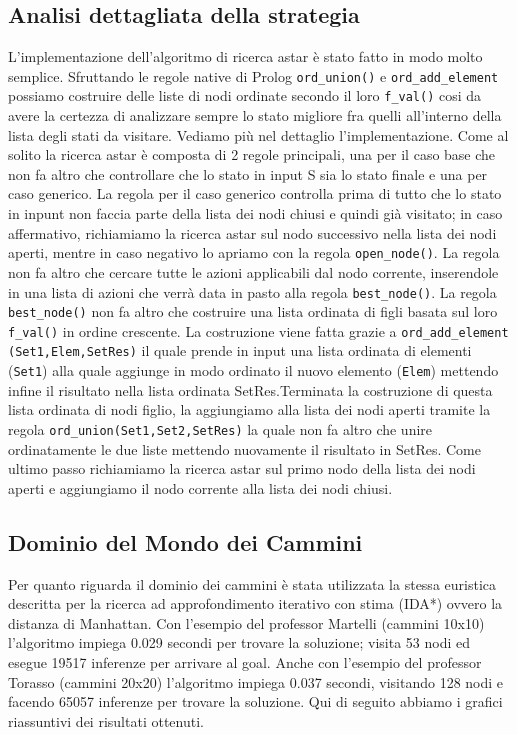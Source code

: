 \subsection{Analisi dettagliata della strategia}

L'implementazione dell'algoritmo di ricerca astar è stato fatto in modo molto semplice. Sfruttando le regole native di Prolog \lstinline{ord_union()} e \lstinline{ord_add_element} possiamo costruire delle liste di nodi ordinate secondo il loro \lstinline{f_val()} cosi da avere la certezza di analizzare sempre lo stato migliore fra quelli all'interno della lista degli stati da visitare. Vediamo più nel dettaglio l'implementazione. Come al solito la ricerca astar è composta di 2 regole principali, una per il caso base che non fa altro che controllare che lo stato in input S sia lo stato finale e una per caso generico. La regola per il caso generico controlla prima di tutto che lo stato in inpunt non faccia parte della lista dei nodi chiusi e quindi già visitato; in caso affermativo, richiamiamo la ricerca astar sul nodo successivo nella lista dei nodi aperti, mentre in caso negativo lo apriamo con la regola \lstinline{open_node()}. La regola non fa altro che cercare tutte le azioni applicabili dal nodo corrente, inserendole in una lista di azioni che verrà data in pasto alla regola \lstinline{best_node()}. La regola \lstinline{best_node()} non fa altro che costruire una lista ordinata di figli basata sul loro \lstinline{f_val()} in ordine crescente.
La costruzione viene fatta grazie a \lstinline{ord_add_element (Set1,Elem,SetRes)} il quale prende in input una lista ordinata di elementi (\lstinline{Set1}) alla quale aggiunge in modo ordinato il nuovo elemento (\lstinline{Elem}) mettendo infine il risultato nella lista ordinata SetRes.Terminata la costruzione di questa lista ordinata di nodi figlio, la aggiungiamo alla lista dei nodi aperti tramite la regola \lstinline{ord_union(Set1,Set2,SetRes)} la quale non fa altro che unire ordinatamente le due liste mettendo nuovamente il risultato in SetRes.
Come ultimo passo richiamiamo la ricerca astar sul primo nodo della lista dei nodi aperti e aggiungiamo il nodo corrente alla lista dei nodi chiusi.

\subsection{Dominio del Mondo dei Cammini}
Per quanto riguarda il dominio dei cammini è stata utilizzata la stessa euristica descritta per la ricerca ad approfondimento iterativo con stima (IDA*) ovvero la distanza di Manhattan. Con l'esempio del professor Martelli (cammini 10x10) l'algoritmo impiega 0.029 secondi per trovare la soluzione; visita 53 nodi ed esegue 19517 inferenze per arrivare al goal. Anche con l'esempio del professor Torasso (cammini 20x20) l'algoritmo impiega 0.037 secondi, visitando 128 nodi e facendo 65057 inferenze per trovare la soluzione.
Qui di seguito abbiamo i grafici riassuntivi dei risultati ottenuti.

